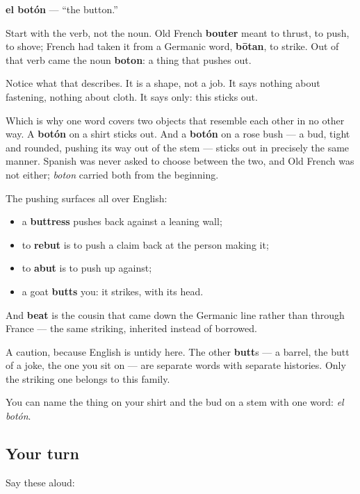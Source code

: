 \begin{cousinweb}
\textbf{el botón} — \textquotedblleft{}the button.\textquotedblright{}

Start with the verb, not the noun. Old French \textbf{bouter} meant to thrust, to push, to shove; French had taken it from a Germanic word, \textbf{bōtan}, to strike. Out of that verb came the noun \textbf{boton}: a thing that pushes out.

Notice what that describes. It is a shape, not a job. It says nothing about fastening, nothing about cloth. It says only: this sticks out.

Which is why one word covers two objects that resemble each other in no other way. A \textbf{botón} on a shirt sticks out. And a \textbf{botón} on a rose bush — a bud, tight and rounded, pushing its way out of the stem — sticks out in precisely the same manner. Spanish was never asked to choose between the two, and Old French was not either; \emph{boton} carried both from the beginning.

The pushing surfaces all over English:

\begin{itemize}
\raggedright
  \item a \textbf{buttress} pushes back against a leaning wall;
  \item to \textbf{rebut} is to push a claim back at the person making it;
  \item to \textbf{abut} is to push up against;
  \item a goat \textbf{butts} you: it strikes, with its head.
\end{itemize}

And \textbf{beat} is the cousin that came down the Germanic line rather than through France — the same striking, inherited instead of borrowed.

A caution, because English is untidy here. The other \textbf{butt}s — a barrel, the butt of a joke, the one you sit on — are separate words with separate histories. Only the striking one belongs to this family.
\end{cousinweb}

\begin{grammarlens}[title={What you've built}]
You can name the thing on your shirt and the bud on a stem with one word: \emph{el botón}.
\end{grammarlens}

\subsection*{Your turn}
Say these aloud:

